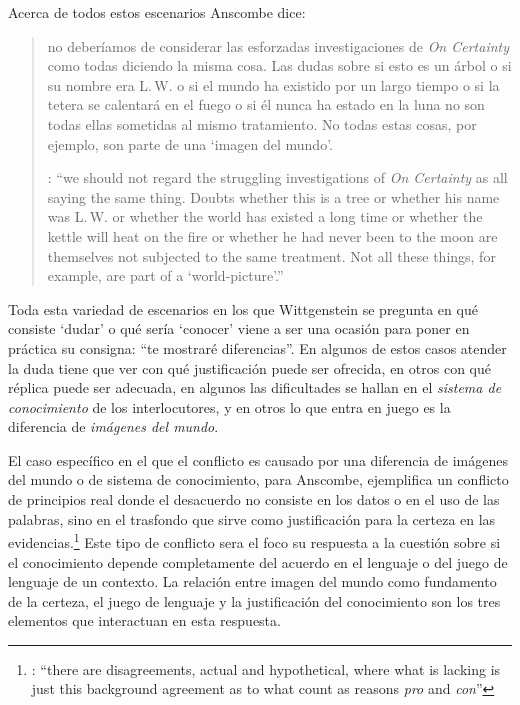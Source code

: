 Acerca de todos estos escenarios Anscombe dice: \blockquote[{\cite[130]{anscombe1981parmenides:qli}}: \enquote{we should not regard the struggling investigations of \emph{On Certainty} as all saying the same thing. Doubts whether this is a tree or whether his name was L.\,W. or whether the world has existed a long time or whether the kettle will heat on the fire or whether he had never been to the moon are themselves not subjected to the same treatment. Not all these things, for example, are part of a `world-picture'.}]{no deberíamos de considerar las esforzadas investigaciones de \emph{On Certainty} como todas diciendo la misma cosa. Las dudas sobre si esto es un árbol o si su nombre era L.\,W. o si el mundo ha existido por un largo tiempo o si la tetera se calentará en el fuego o si él nunca ha estado en la luna no son todas ellas sometidas al mismo tratamiento. No todas estas cosas, por ejemplo, son parte de una `imagen del mundo'.} Toda esta variedad de escenarios en los que Wittgenstein se pregunta en qué consiste `dudar' o qué sería `conocer' viene a ser una ocasión para poner en práctica su consigna: \enquote{te mostraré diferencias}. En algunos de estos casos atender la duda tiene que ver con qué justificación puede ser ofrecida, en otros con qué réplica puede ser adecuada, en algunos las dificultades se hallan en el \emph{sistema de conocimiento} de los interlocutores, y en otros lo que entra en juego es la diferencia de \emph{imágenes del mundo}.

El caso específico en el que el conflicto es causado por una diferencia de imágenes del mundo o de sistema de conocimiento, para Anscombe, ejemplifica un conflicto de principios real donde el desacuerdo no consiste en los datos o en el uso de las palabras, sino en el trasfondo que sirve como justificación para la certeza en las evidencias.\footnote{\cite[Cf.~][222]{teichmann2008ans}: \enquote{there are disagreements, actual and hypothetical, where what is lacking is just this background agreement as to what count as reasons \emph{pro} and \emph{con}}} Este tipo de conflicto sera el foco su respuesta a la cuestión sobre si el conocimiento depende completamente del acuerdo en el lenguaje o del juego de lenguaje de un contexto. La relación entre imagen del mundo como fundamento de la certeza, el juego de lenguaje y la justificación del conocimiento son los tres elementos que interactuan en esta respuesta.

